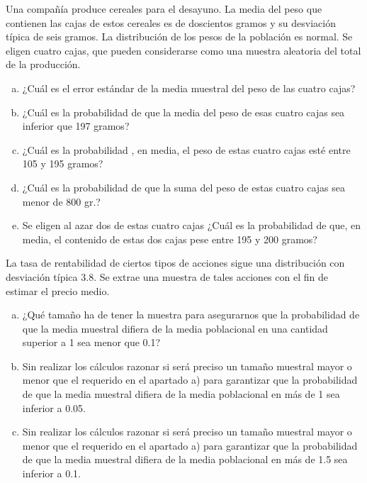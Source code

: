 \documentclass[12pt]{article}\usepackage[]{graphicx}\usepackage[]{color}
\begin{document}
\begin{prob}
Una compañía produce cereales para el desayuno. La media del
peso que contienen las cajas de estos cereales es de doscientos
gramos y su desviación típica de seis gramos. La distribución de
los pesos de la población es normal. Se eligen cuatro cajas, que
pueden considerarse como una muestra aleatoria del total de la
producción.
\begin{enumerate}[a)]
\item ¿Cuál es el error estándar de la media muestral del peso de
las cuatro cajas?
\item ¿Cuál es la probabilidad de que la media del peso de esas cuatro cajas
sea inferior  que 197 gramos?
\item ¿Cuál es la probabilidad , en media, el peso de estas
cuatro cajas esté entre 105 y 195 gramos?
\item ¿Cuál es la probabilidad de que la suma del peso de estas
cuatro cajas sea menor de 800 gr.?
\item Se eligen al azar dos de estas cuatro cajas ¿Cuál es la
probabilidad de que, en media, el contenido de estas dos cajas
pese entre 195 y 200 gramos?
\end{enumerate}
\end{prob}

\begin{prob} La tasa de rentabilidad de ciertos tipos de acciones
sigue una distribución con desviación típica 3.8. Se extrae una
muestra de tales acciones con el fin de estimar el precio medio.
\begin{enumerate}[a)]
\item ¿Qué tamaño ha de tener la muestra para asegurarnos que la
probabilidad de que la media muestral difiera de la media
poblacional en una cantidad superior a 1 sea menor que 0.1?
\item Sin realizar los cálculos razonar si será preciso  un tamaño
muestral mayor o menor que el requerido  en el apartado a) para
garantizar que la probabilidad de que la media muestral difiera
de la media poblacional en más de 1 sea inferior a 0.05.
\item Sin realizar los cálculos razonar si será preciso  un tamaño
muestral mayor o menor que el requerido  en el apartado a) para
garantizar que la probabilidad de que la media muestral difiera
de la media poblacional en más de 1.5 sea inferior a 0.1.
\end{enumerate}
\end{prob}
\end{document}
